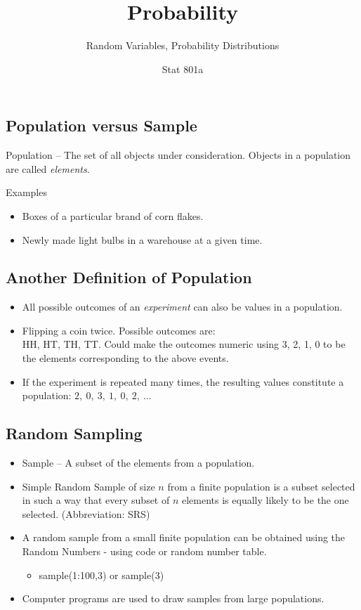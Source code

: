 \documentclass[
  letterpaper,
  DIV=11,
  numbers=noendperiod]{scrartcl}
\title{Probability}
\subtitle{Random Variables, Probability Distributions}
\author{Stat 801a}
\date{}
\providecommand{\tightlist}{%
  \setlength{\itemsep}{0pt}\setlength{\parskip}{0pt}}\usepackage{longtable,booktabs,array}
\begin{document}
\maketitle


\subsection{Population versus Sample}\label{population-versus-sample}

{Population} -- The set of all objects under consideration. Objects in a
population are called {\emph{elements}}.

{Examples}

\begin{itemize}
\item
  Boxes of a particular brand of corn flakes.
\item
  Newly made light bulbs in a warehouse at a given time.
\end{itemize}

\subsection{Another Definition of
Population}\label{another-definition-of-population}

\begin{itemize}
\item
  All possible outcomes of an {\emph{experiment}} can also be values in
  a population.
\item
  Flipping a coin twice. Possible outcomes are:\\
  HH, HT, TH, TT. Could make the outcomes numeric using 3, 2, 1, 0 to be
  the elements corresponding to the above {events}.
\item
  If the experiment is repeated many times, the resulting values
  constitute a population: \(2,\ 0,\ 3,\ 1,\ 0,\ 2,\ \dots\)
\end{itemize}

\subsection{Random Sampling}\label{random-sampling}

\begin{itemize}
\item
  {Sample} -- A subset of the elements from a population.
\item
  {Simple Random Sample} of size \(n\) from a {finite population} is a
  subset selected in such a way that every subset of \(n\) elements is
  equally likely to be the one selected. (Abbreviation: SRS)
\item
  A random sample from a small finite population can be obtained using
  the {Random Numbers} - using code or random number table.

  \begin{itemize}
  \tightlist
  \item
    sample(1:100,3) or sample(3)
  \end{itemize}
\item
  Computer programs are used to draw samples from large populations.
\end{itemize}
\end{document}
